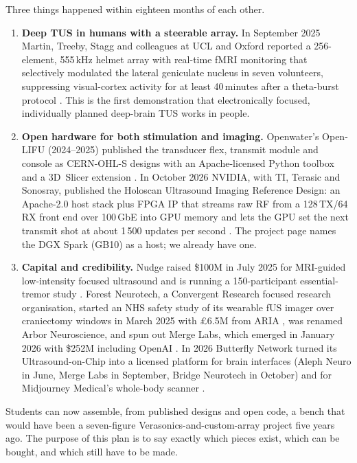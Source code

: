 \documentclass[11pt,a4paper]{article}
\begin{document}
Three things happened within eighteen months of each other.

\begin{enumerate}[leftmargin=*]
\item \textbf{Deep TUS in humans with a steerable array.} In September 2025 Martin, Treeby, Stagg and colleagues at UCL and Oxford reported a 256-element, 555\,kHz helmet array with real-time fMRI monitoring that selectively modulated the lateral geniculate nucleus in seven volunteers, suppressing visual-cortex activity for at least 40\,minutes after a theta-burst protocol \cite{martin2025}. This is the first demonstration that electronically focused, individually planned deep-brain TUS works in people.
\item \textbf{Open hardware for both stimulation and imaging.} Openwater's Open-LIFU (2024--2025) published the transducer flex, transmit module and console as CERN-OHL-S designs with an Apache-licensed Python toolbox and a 3D~Slicer extension \cite{openlifu}. In October 2026 NVIDIA, with TI, Terasic and Sonosray, published the Holoscan Ultrasound Imaging Reference Design: an Apache-2.0 host stack plus FPGA IP that streams raw RF from a 128\,TX/64\,RX front end over 100\,GbE into GPU memory and lets the GPU set the next transmit shot at about 1\,500 updates per second \cite{holoscan,simson2026}. The project page names the DGX Spark (GB10) as a host; we already have one.
\item \textbf{Capital and credibility.} Nudge raised \$100M in July 2025 for MRI-guided low-intensity focused ultrasound and is running a 150-participant essential-tremor study \cite{nudge}. Forest Neurotech, a Convergent Research focused research organisation, started an NHS safety study of its wearable fUS imager over craniectomy windows in March 2025 with \pounds6.5M from ARIA \cite{forest1}, was renamed Arbor Neuroscience, and spun out Merge Labs, which emerged in January 2026 with \$252M including OpenAI \cite{merge}. In 2026 Butterfly Network turned its Ultrasound-on-Chip into a licensed platform for brain interfaces (Aleph Neuro in June, Merge Labs in September, Bridge Neurotech in October) and for Midjourney Medical's whole-body scanner \cite{bfly_aleph,bfly_merge,bfly_bridge,bfly_midjourney}.
\end{enumerate}

Students can now assemble, from published designs and open code, a bench that would have been a seven-figure Verasonics-and-custom-array project five years ago. The purpose of this plan is to say exactly which pieces exist, which can be bought, and which still have to be made.
\end{document}
